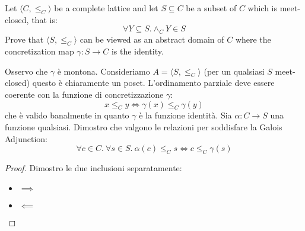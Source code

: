 {Let $\langle C, \leq_C \rangle$ be a complete lattice and let $S \subseteq C$ be a subset of $C$ which is meet-closed, that is:
$$
\forall Y \subseteq S. \wedge_C Y \in S
$$
Prove that $\langle S, \leq_C\rangle$ can be viewed as an abstract domain of $C$ where the concretization map 
$\gamma : S \to C$ is the identity.
}
{
Osservo che $\gamma$ è montona.
Consideriamo $A = \langle S, \leq_C \rangle$ (per un qualsiasi $S$ meet-closed) questo è chiaramente un poset. L'ordinamento parziale
deve essere coerente con la funzione di concretizzazione $\gamma$:
$$
x \leq_C y \iff \gamma(x) \leq_C \gamma(y) 
$$	
che è valido banalmente in quanto $\gamma$ è la funzione identità.
Sia $\alpha: C \to S$ una funzione qualsiasi. Dimostro che valgono le relazioni per soddisfare
la Galois Adjunction:
$$
\forall c \in C .\ \forall s \in S .\ \alpha(c) \leq_C s \iff c \leq_C \gamma(s)
$$
\begin{proof}
	Dimostro le due inclusioni separatamente:
	\begin{itemize}
		\item $\boxed{\implies}$
		\item $\boxed{\impliedby}$
	\end{itemize}
\end{proof}
}